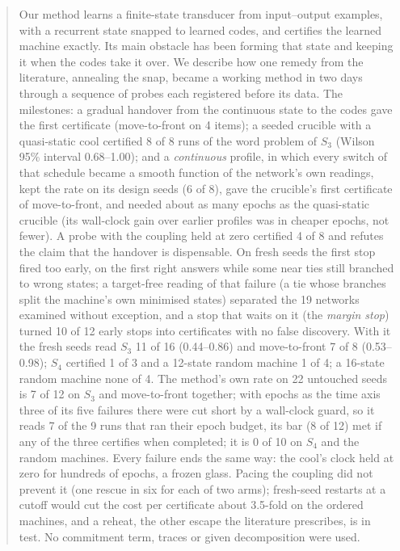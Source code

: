\documentclass[11pt]{article}
\begin{document}
\begin{abstract}
Our method learns a finite-state transducer from input--output examples, with a recurrent state
snapped to learned codes, and certifies the learned machine exactly. Its main obstacle has been
forming that state and keeping it when the codes take it over. We describe how one remedy from the
literature, annealing the snap, became a working method in two days through a sequence of probes
each registered before its data. The milestones: a gradual handover from the continuous state to the
codes gave the first certificate (move-to-front on 4 items); a seeded crucible with a quasi-static
cool certified 8 of 8 runs of the word problem of $S_3$ (Wilson 95\% interval 0.68--1.00); and a
\emph{continuous} profile, in which every switch of that schedule became a smooth function of the
network's own readings, kept the rate on its design seeds (6 of 8), gave the crucible's first
certificate of move-to-front, and needed about as many epochs as the quasi-static crucible (its
wall-clock gain over earlier profiles was in cheaper epochs, not fewer). A probe with the coupling held at
zero certified 4 of 8 and refutes the claim that the handover is dispensable. On fresh seeds the
first stop fired too early, on the first right answers while some near ties still branched to wrong
states; a target-free reading of that failure (a tie whose branches split the machine's own minimised
states) separated the 19 networks examined without exception, and a stop that waits on it (the
\emph{margin stop}) turned 10 of 12 early stops into certificates with no false discovery. With it the
fresh seeds read $S_3$ 11 of 16 (0.44--0.86) and move-to-front 7 of 8 (0.53--0.98); $S_4$ certified 1
of 3 and a 12-state random machine 1 of 4; a 16-state random machine none of 4. The method's own rate
on 22 untouched seeds is 7 of 12 on $S_3$ and move-to-front together; with epochs as the time axis
three of its five failures there were cut short by a wall-clock guard, so it reads 7 of the 9 runs
that ran their epoch budget, its bar (8 of 12) met if any of the three certifies when completed; it is
0 of 10 on $S_4$ and the random machines. Every failure ends the same way: the
cool's clock held at zero for hundreds of epochs, a frozen glass. Pacing the coupling did not prevent
it (one rescue in six for each of two arms); fresh-seed restarts at a cutoff would cut the cost per
certificate about 3.5-fold on the ordered machines, and a reheat, the other escape the literature
prescribes, is in test. No commitment term, traces or given decomposition were used.
\end{abstract}
\end{document}
